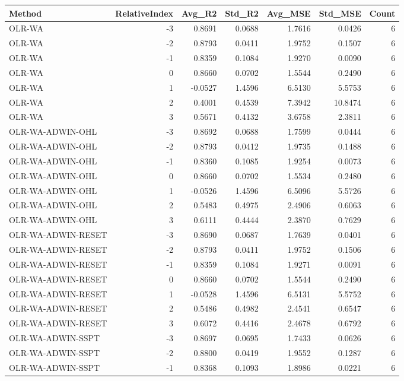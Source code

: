 \begin{tabular}{lrrrrrr}
\toprule
Method & RelativeIndex & Avg_R2 & Std_R2 & Avg_MSE & Std_MSE & Count \\
\midrule
OLR-WA & -3 & 0.8691 & 0.0688 & 1.7616 & 0.0426 & 6 \\
OLR-WA & -2 & 0.8793 & 0.0411 & 1.9752 & 0.1507 & 6 \\
OLR-WA & -1 & 0.8359 & 0.1084 & 1.9270 & 0.0090 & 6 \\
OLR-WA & 0 & 0.8660 & 0.0702 & 1.5544 & 0.2490 & 6 \\
OLR-WA & 1 & -0.0527 & 1.4596 & 6.5130 & 5.5753 & 6 \\
OLR-WA & 2 & 0.4001 & 0.4539 & 7.3942 & 10.8474 & 6 \\
OLR-WA & 3 & 0.5671 & 0.4132 & 3.6758 & 2.3811 & 6 \\
OLR-WA-ADWIN-OHL & -3 & 0.8692 & 0.0688 & 1.7599 & 0.0444 & 6 \\
OLR-WA-ADWIN-OHL & -2 & 0.8793 & 0.0412 & 1.9735 & 0.1488 & 6 \\
OLR-WA-ADWIN-OHL & -1 & 0.8360 & 0.1085 & 1.9254 & 0.0073 & 6 \\
OLR-WA-ADWIN-OHL & 0 & 0.8660 & 0.0702 & 1.5534 & 0.2480 & 6 \\
OLR-WA-ADWIN-OHL & 1 & -0.0526 & 1.4596 & 6.5096 & 5.5726 & 6 \\
OLR-WA-ADWIN-OHL & 2 & 0.5483 & 0.4975 & 2.4906 & 0.6063 & 6 \\
OLR-WA-ADWIN-OHL & 3 & 0.6111 & 0.4444 & 2.3870 & 0.7629 & 6 \\
OLR-WA-ADWIN-RESET & -3 & 0.8690 & 0.0687 & 1.7639 & 0.0401 & 6 \\
OLR-WA-ADWIN-RESET & -2 & 0.8793 & 0.0411 & 1.9752 & 0.1506 & 6 \\
OLR-WA-ADWIN-RESET & -1 & 0.8359 & 0.1084 & 1.9271 & 0.0091 & 6 \\
OLR-WA-ADWIN-RESET & 0 & 0.8660 & 0.0702 & 1.5544 & 0.2490 & 6 \\
OLR-WA-ADWIN-RESET & 1 & -0.0528 & 1.4596 & 6.5131 & 5.5752 & 6 \\
OLR-WA-ADWIN-RESET & 2 & 0.5486 & 0.4982 & 2.4541 & 0.6547 & 6 \\
OLR-WA-ADWIN-RESET & 3 & 0.6072 & 0.4416 & 2.4678 & 0.6792 & 6 \\
OLR-WA-ADWIN-SSPT & -3 & 0.8697 & 0.0695 & 1.7433 & 0.0626 & 6 \\
OLR-WA-ADWIN-SSPT & -2 & 0.8800 & 0.0419 & 1.9552 & 0.1287 & 6 \\
OLR-WA-ADWIN-SSPT & -1 & 0.8368 & 0.1093 & 1.8986 & 0.0221 & 6 \\

\end{tabular}
